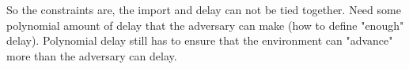 \begin{bbox}[title={\achan}]

\OnInputp

\end{bbox}


So the constraints are, the import and delay can not be tied together.
Need some polynomial amount of delay that the adversary can make (how to define "enough" delay).
Polynomial delay still has to ensure that the environment can "advance" more than the adversary can delay.


